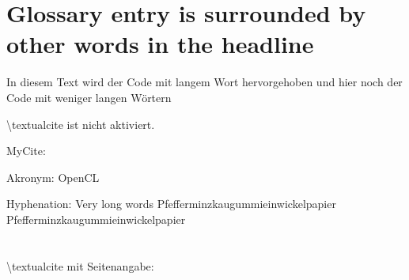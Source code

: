 \section{Glossary entry  is surrounded by other words in the headline}
In diesem Text wird der Code  mit langem Wort hervorgehoben und hier noch der Code mit weniger langen Wörtern 

{{\textbackslash}textualcite ist nicht aktiviert.} %


MyCite: 

Akronym: \gls{OpenCL}

Hyphenation: Very long words Pfefferminzkaugummieinwickelpapier Pfefferminzkaugummieinwickelpapier

\section{}

	{\textbackslash}textualcite mit Seitenangabe: 
